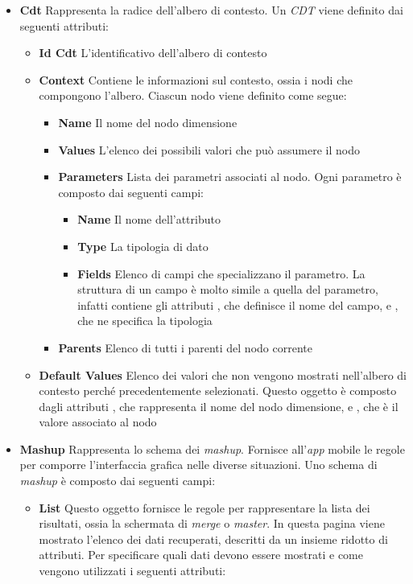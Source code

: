 \begin{itemize}
	\item \textbf{Cdt}
	Rappresenta la radice dell'albero di contesto. Un \emph{CDT} viene definito dai seguenti attributi:
	\begin{itemize}
		\item \textbf{Id Cdt}
		L'identificativo dell'albero di contesto
		\item \textbf{Context}
		Contiene le informazioni sul contesto, ossia i nodi che compongono l'albero. Ciascun nodo viene definito come segue:
		\begin{itemize}
			\item \textbf{Name}
			Il nome del nodo dimensione
			\item \textbf{Values}
			L'elenco dei possibili valori che può assumere il nodo
			\item \textbf{Parameters}
			Lista dei parametri associati al nodo. Ogni parametro è composto dai seguenti campi:
			\begin{itemize}
				\item \textbf{Name}
				Il nome dell'attributo
				\item \textbf{Type}
				La tipologia di dato
				\item \textbf{Fields}
				Elenco di campi che specializzano il parametro. La struttura di un campo è molto simile a quella del parametro, infatti contiene gli attributi , che definisce il nome del campo, e , che ne specifica la tipologia
			\end{itemize}
			\item \textbf{Parents}
			Elenco di tutti i parenti del nodo corrente
		\end{itemize}
		\item \textbf{Default Values}
		Elenco dei valori che non vengono mostrati nell'albero di contesto perché precedentemente selezionati. Questo oggetto è composto dagli attributi , che rappresenta il nome del nodo dimensione, e , che è il valore associato al nodo
	\end{itemize}
	\item \textbf{Mashup}
	Rappresenta lo schema dei \emph{mashup}. Fornisce all'\emph{app} mobile le regole per comporre l'interfaccia grafica nelle diverse situazioni. Uno schema di \emph{mashup} è composto dai seguenti campi:
	\begin{itemize}
		\item \textbf{List}
		Questo oggetto fornisce le regole per rappresentare la lista dei risultati, ossia la schermata di \emph{merge} o \emph{master}. In questa pagina viene mostrato l'elenco dei dati recuperati, descritti da un insieme ridotto di attributi. Per specificare quali dati devono essere mostrati e come vengono utilizzati i seguenti attributi:

\end{itemize}
\end{itemize}
